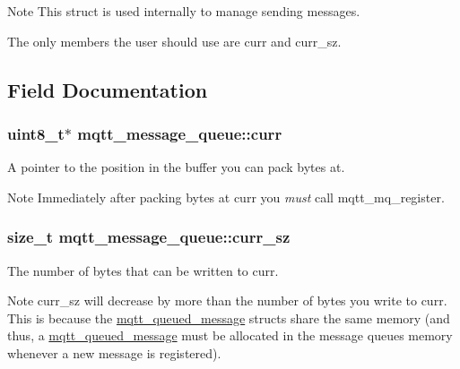 \begin{DoxyNote}{Note}
This struct is used internally to manage sending messages. 

The only members the user should use are {\ttfamily curr} and {\ttfamily curr\+\_\+sz}. 
\end{DoxyNote}


\subsection{Field Documentation}
\subsubsection[{\texorpdfstring{curr}{curr}}]{\setlength{\rightskip}{0pt plus 5cm}uint8\+\_\+t$\ast$ mqtt\+\_\+message\+\_\+queue\+::curr}\hypertarget{structmqtt__message__queue_a6fdfd281cd9d9ac4bfa69840e5cbd359}{}\label{structmqtt__message__queue_a6fdfd281cd9d9ac4bfa69840e5cbd359}


A pointer to the position in the buffer you can pack bytes at. 

\begin{DoxyNote}{Note}
Immediately after packing bytes at {\ttfamily curr} you {\itshape must} call mqtt\+\_\+mq\+\_\+register. 
\end{DoxyNote}
\subsubsection[{\texorpdfstring{curr\+\_\+sz}{curr_sz}}]{\setlength{\rightskip}{0pt plus 5cm}size\+\_\+t mqtt\+\_\+message\+\_\+queue\+::curr\+\_\+sz}\hypertarget{structmqtt__message__queue_a0fe32958dfdb1872f040d7f86ca9a4b9}{}\label{structmqtt__message__queue_a0fe32958dfdb1872f040d7f86ca9a4b9}


The number of bytes that can be written to {\ttfamily curr}. 

\begin{DoxyNote}{Note}
curr\+\_\+sz will decrease by more than the number of bytes you write to {\ttfamily curr}. This is because the \hyperlink{structmqtt__queued__message}{mqtt\+\_\+queued\+\_\+message} structs share the same memory (and thus, a \hyperlink{structmqtt__queued__message}{mqtt\+\_\+queued\+\_\+message} must be allocated in the message queue\textquotesingle{}s memory whenever a new message is registered). 
\end{DoxyNote}
